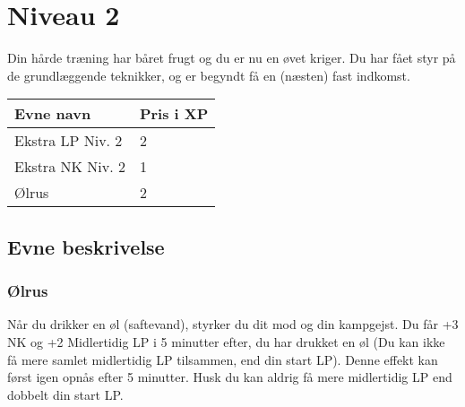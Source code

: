 \chapter*{Niveau 2}
Din hårde træning har båret frugt og du er nu en øvet kriger. Du har fået styr på de grundlæggende teknikker, og er begyndt få en (næsten) fast indkomst. 
\begin{table}[H]
    \centering
    \begin{tabular}{|p{}|p{}|}
    \rowcolor{cerulean!80}\hline
        Evne navn & Pris i XP \\\hline
         Ekstra LP Niv. 2 & 2 \\\hline
         Ekstra NK Niv. 2 & 1 \\\hline
         Ølrus & 2\\
         \hline
    \end{tabular}
\end{table}
\section{Evne beskrivelse}





\subsection{Ølrus}
Når du drikker en øl (saftevand), styrker du dit mod og din kampgejst. Du får +3 NK og +2 Midlertidig LP i 5 minutter efter, du har drukket en øl (Du kan ikke få mere samlet midlertidig LP tilsammen, end din start LP). Denne effekt kan først igen opnås efter 5 minutter. Husk du kan aldrig få mere midlertidig LP end dobbelt din start LP.\\